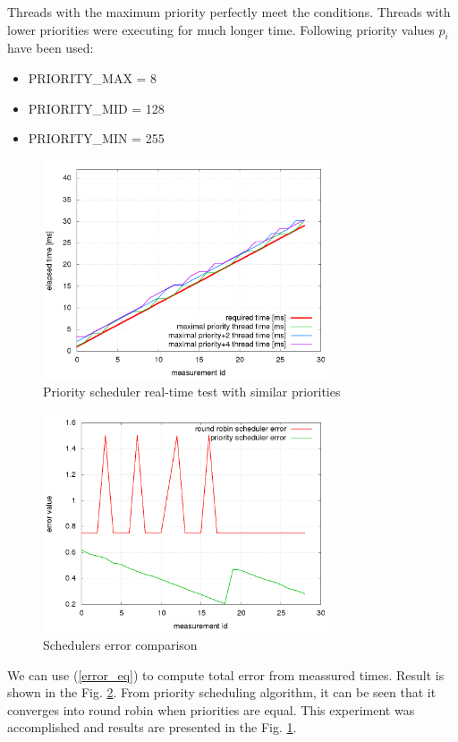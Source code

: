 \documentclass[a4paper, conference]{IEEEtran}
\begin{document}
Threads with the maximum priority perfectly meet the conditions. Threads with lower priorities were executing for much longer time. Following priority values $p_i$ have been used:

\begin{itemize}
	\item PRIORITY\_MAX = 8		
	\item PRIORITY\_MID = 128
	\item PRIORITY\_MIN = 255
\end{itemize}


\begin{figure}[h]
\centering
\includegraphics[width=3.4in]{priority_scheduler_similar_priority.png}
\caption{Priority scheduler real-time test with similar priorities}
\label{fig_priority_scheduler_similar_priority}
\end{figure}

\begin{figure}[H]
\centering
\includegraphics[width=3.4in]{scheduler_error.png}
\caption{Schedulers error comparison}
\label{fig_error}
\end{figure}

We can use (\ref{error_eq}) to compute total error from meassured times. Result is shown in the Fig. \ref{fig_error}. From priority scheduling algorithm, it can be seen that it converges into round robin when priorities are equal. This experiment was accomplished and results are presented in the Fig. \ref{fig_priority_scheduler_similar_priority}.
\end{document}
